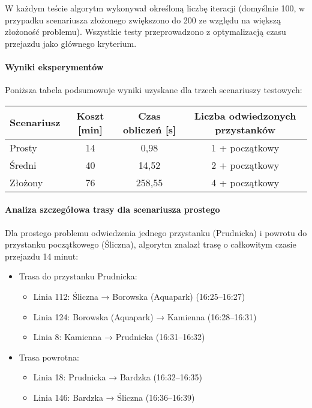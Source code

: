 \documentclass[12pt,a4paper]{article}
\begin{document}
W każdym teście algorytm wykonywał określoną liczbę iteracji (domyślnie 100, w przypadku scenariusza złożonego zwiększono do 200 ze względu na większą złożoność problemu). Wszystkie testy przeprowadzono z optymalizacją czasu przejazdu jako głównego kryterium.

\paragraph{Wyniki eksperymentów}
Poniższa tabela podsumowuje wyniki uzyskane dla trzech scenariuszy testowych:

\begin{center}
\begin{tabular}{|l|c|c|c|}
\hline
\textbf{Scenariusz} & \textbf{Koszt [min]} & \textbf{Czas obliczeń [s]} & \textbf{Liczba odwiedzonych przystanków} \\
\hline
Prosty & 14 & 0,98 & 1 + początkowy \\
Średni & 40 & 14,52 & 2 + początkowy \\
Złożony & 76 & 258,55 & 4 + początkowy \\
\hline
\end{tabular}
\end{center}

\paragraph{Analiza szczegółowa trasy dla scenariusza prostego}
Dla prostego problemu odwiedzenia jednego przystanku (Prudnicka) i powrotu do przystanku początkowego (Śliczna), algorytm znalazł trasę o całkowitym czasie przejazdu 14 minut:

\begin{itemize}
    \item Trasa do przystanku Prudnicka:
    \begin{itemize}
        \item Linia 112: Śliczna → Borowska (Aquapark) (16:25--16:27)
        \item Linia 124: Borowska (Aquapark) → Kamienna (16:28--16:31)
        \item Linia 8: Kamienna → Prudnicka (16:31--16:32)
    \end{itemize}
    \item Trasa powrotna:
    \begin{itemize}
        \item Linia 18: Prudnicka → Bardzka (16:32--16:35)
        \item Linia 146: Bardzka → Śliczna (16:36--16:39)
    \end{itemize}
\end{itemize}
\end{document}
